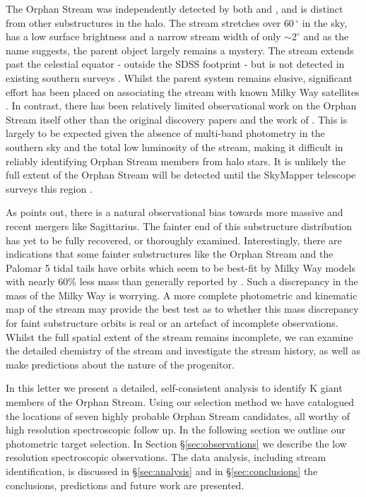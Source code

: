 \documentclass{emulateapj}
\begin{document}
The Orphan Stream was independently detected by both \citet{Grillmair;Dionatos_2006} and \citet{Belokurov;et-al_2006}, and is distinct from other substructures in the halo. The stream stretches over $60\,^\circ$ in the sky, has a low surface brightness and a narrow stream width of only $\sim2^\circ$ and as the name suggests, the parent object largely remains a mystery. The stream extends past the celestial equator \-- outside the SDSS footprint \-- but is not detected in existing southern surveys \citep{Newberg;et-al_2010}. Whilst the parent system remains elusive, significant effort has been placed on associating the stream with known Milky Way satellites \citep{Zucker;et-al_2006, Fellhaur;et-al_2007,Jin;Lynden_Bell_2007,Sales;et-al_2008}. In contrast, there has been relatively limited observational work on the Orphan Stream itself other than the original discovery papers \citep{Grillmair;Dionatos_2006, Belokurov;et-al_2006, Belokurov;et-al_2007} and the work of \citet{Newberg;et-al_2010}. This is largely to be expected given the absence of multi-band photometry in the southern sky and the total low luminosity of the stream, making it difficult in reliably identifying Orphan Stream members from halo stars. It is unlikely the full extent of the Orphan Stream will be detected until the SkyMapper telescope surveys this region \citep{Keller;et-al_2007}. 

As \citet{Sales;et-al_2008} points out, there is a natural observational bias towards more massive and recent mergers like Sagittarius. The fainter end of this substructure distribution has yet to be fully recovered, or thoroughly examined. Interestingly, there are indications that  some fainter substructures like the Orphan Stream \citep{Newberg;et-al_2010} and the Palomar 5 tidal tails \citep{Odenkirchen;et-al_2009} have orbits which seem to be best-fit by Milky Way models with nearly 60\% less mass \citep{Newberg;et-al_2010} than generally reported by \citet{Xue;et-al_2008, Koposov;et-al_2010}. Such a discrepancy in the mass of the Milky Way is worrying. A more complete photometric and kinematic map of the stream may provide the best test as to whether this mass discrepancy for faint substructure orbits is real or an artefact of incomplete observations. Whilst the full spatial extent of the stream remains incomplete, we can examine the detailed chemistry of the stream and investigate the stream history, as well as make predictions about the nature of the progenitor.

In this letter we present a detailed, self-consistent analysis to identify K giant members of the Orphan Stream. Using our selection method we have catalogued the locations of seven highly probable Orphan Stream candidates, all worthy of high resolution spectroscopic follow up. In the following section we outline our photometric target selection. In Section \S\ref{sec:observations} we describe the low resolution spectroscopic observations. The data analysis, including stream identification, is discussed in \S\ref{sec:analysis} and in \S\ref{sec:conclusions} the conclusions, predictions and future work are presented.
\end{document}
